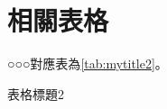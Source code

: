 \chapter{相關表格}
\label{chapter:appendix_tables}

    ○○○對應表為\ref{tab:mytitle2}。
    \begin{table}[htbp]
        \centering
        \caption{表格標題2}
        \label{tab:mytitle2}
        
    \end{table}

